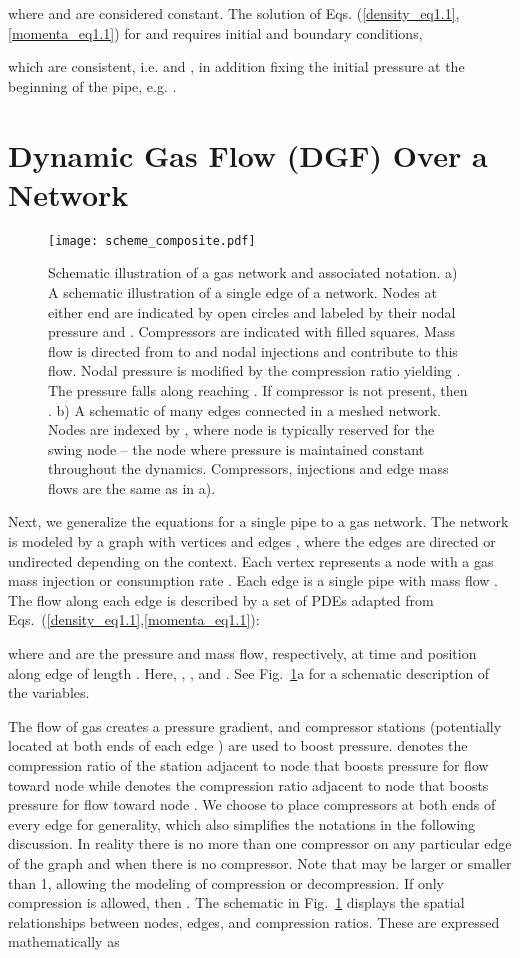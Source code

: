 \documentclass[10pt, conference, compsocconf]{IEEEtran}
\begin{document}
where   and  are considered constant. The solution of Eqs. (\ref{density_eq1.1}, \ref{momenta_eq1.1}) for  and  requires initial and boundary conditions,

which are consistent, i.e.  and , in addition fixing the initial pressure at the beginning of the pipe, e.g. .

\section{Dynamic Gas Flow (DGF) Over a Network}
\label{subsec:DGF}

\begin{figure}
\centering
\texttt{[image: scheme\_composite.pdf]}
\caption{Schematic illustration of a gas network and associated notation. a) A schematic illustration of a single edge  of a network. Nodes at either end are indicated by open circles and labeled by their nodal pressure  and . Compressors are indicated with filled squares. Mass flow  is directed from  to  and nodal injections  and  contribute to this flow. Nodal pressure  is modified by the compression ratio  yielding .  The pressure falls along  reaching .  If compressor  is not present, then .  b) A schematic of many edges connected in a meshed network.  Nodes are indexed by , where node  is typically reserved for the swing node -- the node where pressure is maintained constant throughout the dynamics. Compressors, injections and edge mass flows are the same as in a).
}
\label{fig:scheme}
\end{figure}

Next, we generalize the equations for a single pipe to a gas network. The network is modeled by a graph  with vertices  and edges , where the edges are directed  or undirected  depending on the context. Each vertex  represents a node with a gas mass injection or consumption rate . Each edge  is a single pipe with mass flow . The flow along each edge is described by a set of PDEs adapted from Eqs.~(\ref{density_eq1.1},\ref{momenta_eq1.1}):

where  and  are the pressure and mass flow, respectively, at time  and position  along edge  of length . Here, , , and .  See Fig.~\ref{fig:scheme}a for a schematic description of the variables.

The flow of gas creates a pressure gradient, and compressor stations (potentially located at both ends of each edge ) are used to boost pressure.   denotes the compression ratio of the station adjacent to node  that boosts pressure for flow toward node  while  denotes the compression ratio adjacent to node  that boosts pressure for flow toward node . We choose to place compressors at both ends of every edge for generality, which also simplifies the notations in the following discussion. In reality there is no more than one compressor on any particular edge of the graph and  when there is no compressor. Note that  may be larger or smaller than 1, allowing the modeling of compression or decompression.  If only compression is allowed, then . The schematic in Fig.~\ref{fig:scheme} displays the spatial relationships between nodes, edges, and compression ratios. These are expressed mathematically as
\end{document}
